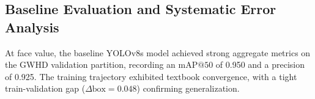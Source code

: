 \begin{table}[h]
\centering
\caption{Baseline YOLOv8s Training Configuration (Control)}
\label{tab:baseline_hyperparams}
\end{table}




\subsection{Baseline Evaluation and Systematic Error Analysis}
\label{subsec:error_analysis}

At face value, the baseline YOLOv8s model achieved strong aggregate metrics on the GWHD validation partition, recording an $\text{mAP@50}$ of 0.950 and a precision of 0.925. The training trajectory exhibited textbook convergence, with a tight train-validation gap ($\Delta\text{box} = 0.048$) confirming generalization. 

